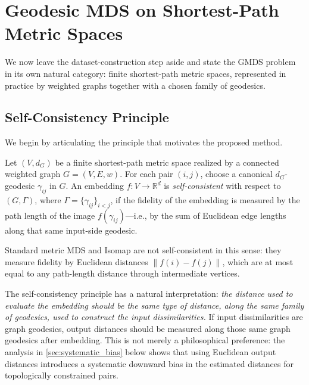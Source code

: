 \documentclass[twoside,11pt]{article}
\newcommand{\R}{\mathbb{R}}
\newcommand{\norm}[1]{\left\|#1\right\|}
\begin{document}
\section{Geodesic MDS on Shortest-Path Metric Spaces}
\label{sec:geodesic_mds_v4}
\label{sec:geodesic_mds}

We now leave the dataset-construction step aside and state the GMDS problem in
its own natural category: finite shortest-path metric spaces, represented in
practice by weighted graphs together with a chosen family of geodesics.

\subsection{Self-Consistency Principle}
\label{sec:self_consistency}

We begin by articulating the principle that motivates the proposed method.

\begin{definition}
  \label{def:self_consistency}
  Let $(V, d_G)$ be a finite shortest-path metric space realized by a
  connected weighted graph $G = (V, E, w)$.  For each pair $(i,j)$, choose a
  canonical $d_G$-geodesic $\gamma_{ij}$ in $G$.  An embedding
  $f: V \to \R^d$ is
  \emph{self-consistent} with respect to $(G, \Gamma)$, where
  $\Gamma = \{\gamma_{ij}\}_{i<j}$, if the fidelity of the embedding is
  measured by the path length of the image $f(\gamma_{ij})$---i.e., by the
  sum of Euclidean edge lengths along that same input-side geodesic.
\end{definition}

Standard metric MDS and Isomap are not self-consistent in this sense:
they measure fidelity by Euclidean distances $\norm{f(i) - f(j)}$, which
are at most equal to any path-length distance through intermediate vertices.

The self-consistency principle has a natural interpretation:
\emph{the distance used to evaluate the embedding should be the same
type of distance, along the same family of geodesics, used to construct
the input dissimilarities.}
If input dissimilarities are graph geodesics, output distances should be
measured along those same graph geodesics after embedding.  This is not
merely a philosophical preference: the
analysis in \cref{sec:systematic_bias} below shows that using Euclidean
output distances introduces a systematic downward bias in the estimated
distances for topologically constrained pairs.
\end{document}
